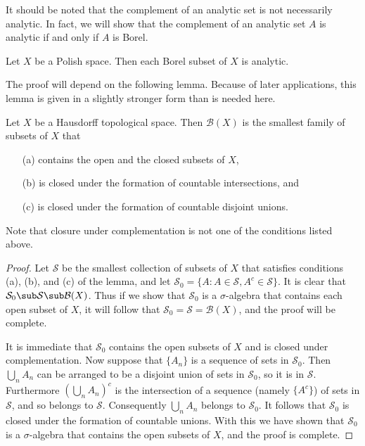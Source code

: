 It should be noted that the complement of an analytic set is not necessarily analytic. In fact, we will show that the complement of an analytic set $A$ is analytic if and only if $A$ is Borel.
\begin{proposition}\label{Polish Borel is analytic}
Let $X$ be a Polish space. Then each Borel subset of $X$ is analytic.
\end{proposition}
The proof will depend on the following lemma. Because of later applications, this lemma is given in a slightly stronger form than is needed here.
\begin{lemma}\label{Borel set char lemma}
Let $X$ be a Hausdorff topological space. Then $\mathcal{B}(X)$ is the smallest family of subsets of $X$ that
\begin{itemize}
\item[(a)] contains the open and the closed subsets of $X$,
\item[(b)] is closed under the formation of countable intersections, and
\item[(c)] is closed under the formation of countable disjoint unions.
\end{itemize}
\end{lemma}
Note that closure under complementation is not one of the conditions listed above.
\begin{proof}
Let $\mathcal{S}$ be the smallest collection of subsets of $X$ that satisfies conditions (a), (b), and (c) of the lemma, and let $\mathcal{S}_0=\{A:A\in \mathcal{S},A^c\in\mathcal{S}\}$. It is clear that $\mathcal{S}_0\sub\mathcal{S}\sub\mathcal{B}(X)$. Thus if we show that $\mathcal{S}_0$ is a $\sigma$-algebra that contains each open subset of $X$, it will follow that $\mathcal{S}_0=\mathcal{S}=\mathcal{B}(X)$, and the proof will be complete.\par
It is immediate that $\mathcal{S}_0$ contains the open subsets of $X$ and is closed under complementation. Now suppose that $\{A_n\}$ is a sequence of sets in $\mathcal{S}_0$. Then $\bigcup_nA_n$ can be arranged to be a disjoint union of sets in $\mathcal{S}_0$, so it is in $\mathcal{S}$. Furthermore $(\bigcup_nA_n)^c$ is the intersection of a sequence (namely $\{A^c\}$) of sets in $\mathcal{S}$, and so belongs to $\mathcal{S}$. Consequently $\bigcup_nA_n$ belongs to $\mathcal{S}_0$. It follows that $\mathcal{S}_0$ is closed under the formation of countable unions. With this we have shown that $\mathcal{S}_0$ is a $\sigma$-algebra that contains the open subsets of $X$, and the proof is complete. 
\end{proof}
